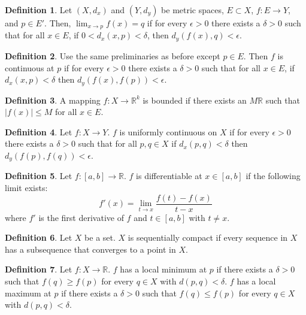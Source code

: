 \documentclass[12pt]{article}
\theoremstyle{definition}
\newtheorem{definition}{Definition}
\theoremstyle{named}
\begin{document}
\renewcommand{\thedefinition}{6.1}
\begin{definition}
    Let $(X,d_x)$ and $(Y,d_y)$ be metric spaces, $E \subset X$, $f: E \to Y$, and $p \in E'$. Then, $\lim_{x \to p} f(x) = q$ if for every $\epsilon > 0$ there exists a $\delta > 0$ such that for all $x \in E$, if $0 < d_x(x,p) < \delta$, then $d_y(f(x), q) < \epsilon$. 
\end{definition}


\renewcommand{\thedefinition}{6.1}
\begin{definition}
    Use the same preliminaries as before except $p \in E$. Then $f$ is continuous at $p$ if for every $\epsilon > 0$ there exists a $\delta > 0$ such that for all $x \in E$, if $d_x(x,p) < \delta$ then $d_y(f(x), f(p)) < \epsilon$. 
\end{definition}


\renewcommand{\thedefinition}{6.1}
\begin{definition}
    A mapping $f: X \to \mathbb{R}^k$ is bounded if there exists an $M \mathbb{R}$ such that $|f(x)| \leq M$ for all $x \in E$. 
\end{definition}


\renewcommand{\thedefinition}{6.1}
\begin{definition}
    Let $f: X \to Y$. $f$ is uniformly continuous on $X$ if for every $\epsilon > 0$ there exists a $\delta > 0$ such that for all $p,q \in X$ if $d_x(p,q) < \delta$ then $d_y(f(p), f(q)) < \epsilon$. 
\end{definition}


\renewcommand{\thedefinition}{6.1}
\begin{definition}
    Let $f: [a,b] \to \mathbb{R}$. $f$ is differentiable at $x \in [a,b]$ if the following limit exists: 
    $$
    f'(x) = \lim_{t \to x} \frac{f(t) - f(x)}{t-x}
    $$
    where $f'$ is the first derivative of $f$ and $t \in [a,b]$ with $t \neq x$. 
\end{definition}

\renewcommand{\thedefinition}{6.1}
\begin{definition}
    Let $X$ be a set. $X$ is sequentially compact if every sequence in $X$ has a subsequence that converges to a point in $X$. 
\end{definition}

\renewcommand{\thedefinition}{6.1}
\begin{definition}
    Let $f: X \to \mathbb{R}$. $f$ has a local minimum at $p$ if there exists a $\delta > 0$ such that $f(q) \geq f(p)$ for every $q \in X$ with $d(p,q) < \delta$. $f$ has a local maximum at $p$ if there exists a $\delta > 0$ such that $f(q) \leq f(p)$ for every $q \in X$ with $d(p,q) < \delta$. 
\end{definition}
\end{document}
